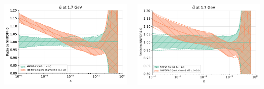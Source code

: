 \documentclass{beamer}
\begin{document}
\begin{frame}
\begin{columns}[c]
\begin{column}{0.5\textwidth}
   \includegraphics[width=\columnwidth]{plots/charm_2}\\
  \end{column}
  \begin{column}{0.5\textwidth}
   \centering
   \includegraphics[width=\columnwidth]{plots/charm_3}\\
  \end{column}
 \end{columns}
\end{frame}
\end{document}
